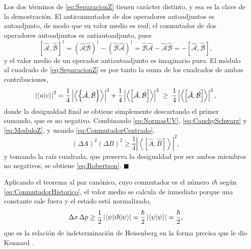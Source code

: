         Los dos términos de \eqref{eq:SeparacionZ} tienen carácter distinto, y esa es la clave de la demostración. El anticonmutador de dos operadores autoadjuntos es autoadjunto, de modo que su valor medio es real; el conmutador de dos operadores autoadjuntos es antiautoadjunto, pues
        \begin{equation}\label{eq:ConmutadorAntihermitico}
            \left[\hat{\mathcal{A}},\hat{\mathcal{B}}\right]^{\dagger} = \left(\hat{\mathcal{A}}\hat{\mathcal{B}}\right)^{\dagger} - \left(\hat{\mathcal{B}}\hat{\mathcal{A}}\right)^{\dagger} = \hat{\mathcal{B}}\hat{\mathcal{A}} - \hat{\mathcal{A}}\hat{\mathcal{B}} = -\left[\hat{\mathcal{A}},\hat{\mathcal{B}}\right],
        \end{equation}
        y el valor medio de un operador antiautoadjunto es imaginario puro. El módulo al cuadrado de \eqref{eq:SeparacionZ} es por tanto la suma de los cuadrados de ambas contribuciones,
        \begin{equation}\label{eq:ModuloZ}
            \left|\braket{u|v}\right|^{2} = \frac{1}{4}\left|\left\langle\left\{\hat{\mathcal{A}},\hat{\mathcal{B}}\right\}\right\rangle\right|^{2} + \frac{1}{4}\left|\left\langle\left[\hat{\mathcal{A}},\hat{\mathcal{B}}\right]\right\rangle\right|^{2}
            \;\geq\; \frac{1}{4}\left|\left\langle\left[\hat{\mathcal{A}},\hat{\mathcal{B}}\right]\right\rangle\right|^{2},
        \end{equation}
        donde la desigualdad final se obtiene simplemente descartando el primer sumando, que es no negativo. Combinando \eqref{eq:NormasUV}, \eqref{eq:CauchySchwarz} y \eqref{eq:ModuloZ}, y usando \eqref{eq:ConmutadorCentrado},
        \begin{equation}\label{eq:RobertsonFinal}
            \left(\Delta A\right)^{2}\left(\Delta B\right)^{2} \geq \frac{1}{4}\left|\left\langle\left[\hat{A},\hat{B}\right]\right\rangle\right|^{2},
        \end{equation}
        y tomando la raíz cuadrada, que preserva la desigualdad por ser ambos miembros no negativos, se obtiene \eqref{eq:Robertson}. $\blacksquare$

        Aplicando el teorema al par canónico, cuyo conmutador es el número $i\hbar$ según \eqref{eq:ConmutadorHistorico}, el valor medio se calcula de inmediato porque una constante sale fuera y el estado está normalizado,
        \begin{equation}\label{eq:HeisenbergCanonico}
            \Delta x\,\Delta p \geq \frac{1}{2}\left|\braket{\psi|i\hbar|\psi}\right| = \frac{\hbar}{2}\left|\braket{\psi|\psi}\right| = \frac{\hbar}{2},
        \end{equation}
        que es la relación de indeterminación de Heisenberg en la forma precisa que le dio Kennard \citep{kennard1927quantenmechanik}.

